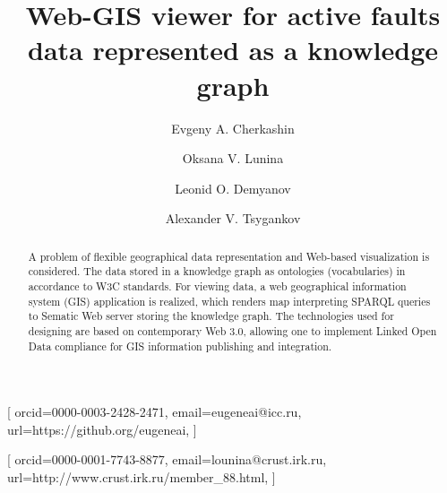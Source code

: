\documentclass[
]{ceurart}
\begin{document}


\title{Web-GIS viewer for active faults data represented as a knowledge graph}

\author[1,3,4]{Evgeny A. Cherkashin}[%
orcid=0000-0003-2428-2471,
email=eugeneai@icc.ru,
url=https://github.org/eugeneai,
]
\address[1]{Matrosov Institute for System Dynamics and Control Theory of Siberian Branch of Russian Academy of Sciences, 134 Lermontov St, Irkutsk, 664033, Russian Federation}

\author[2]{Oksana V. Lunina}[%
orcid=0000-0001-7743-8877,
email=lounina@crust.irk.ru,
url=http://www.crust.irk.ru/member_88.html,
]

\address[2]{Institute of the Earth’s Crust of Siberian Branch of Russian Academy of Sciences, 128 Lermontov St, Irkutsk, 664033, Russian Federation}

\author[3]{Leonid O. Demyanov}

\address[3]{Institute for Mathematics and Informational Technologies, Irkutsk State University, 20~Gagarina Bulv, Irkutsk, 664003, Russian Federation}

\author[4]{Alexander V. Tsygankov}

\address[4]{Institute for Information Technologies and Data Analysis, National Research Irkutsk State Technical University, 83~Lermontov St, Irkutsk, 664074, Russian Federation}

\begin{abstract}
  A problem of flexible geographical data representation and Web-based visualization is considered.  The data stored in a knowledge graph as ontologies (vocabularies) in accordance to W3C standards.  For viewing data, a web geographical information system (GIS) application is realized, which renders map interpreting SPARQL queries to Sematic Web server storing the knowledge graph.  The technologies used for designing are based on contemporary Web 3.0, allowing one to implement Linked Open Data compliance for GIS information publishing and integration.
\end{abstract}
\end{document}
